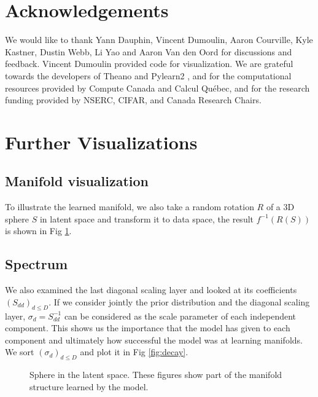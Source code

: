 \documentclass{article}
\begin{document}
\section*{Acknowledgements} 
We would like to thank Yann Dauphin, Vincent Dumoulin, Aaron Courville, Kyle Kastner, Dustin Webb, Li Yao
and Aaron Van den Oord for discussions and feedback. Vincent Dumoulin provided code for visualization.
We are grateful towards the developers of Theano 
\citep{bergstra+all-Theano-NIPS2011, Bastien-Theano-2012} and Pylearn2 \citep{pylearn2_arxiv_2013},
and for the computational resources provided by Compute Canada and Calcul Québec, and for the
research funding provided by NSERC, CIFAR, and Canada Research Chairs.




\newpage
\appendix
\section{Further Visualizations}

\subsection{Manifold visualization}
To illustrate the learned manifold, we
also take a random rotation $R$ of a 3D sphere $S$ in latent space
and transform it to data space, the result $f^{-1}(R(S))$
is shown in Fig \ref{fig:map}.

\subsection{Spectrum}
We also examined the last diagonal scaling layer and looked at its
coefficients $(S_{dd})_{d \leq D}$. If we consider jointly the prior
distribution and the diagonal scaling layer, $\sigma_{d} = S_{dd}^{-1}$ can
be considered as the scale parameter of each independent component. This shows us
the importance that the model has given to each component
and ultimately how successful the model was at learning manifolds. We sort
$(\sigma_{d})_{d \leq D}$ and plot it in Fig \ref{fig:decay}.

\begin{figure}
    \centering {}
    \caption{Sphere in the latent space.
        These figures show part of the manifold structure learned by the model.
        }
    \label{fig:map}
\end{figure}
\end{document}
